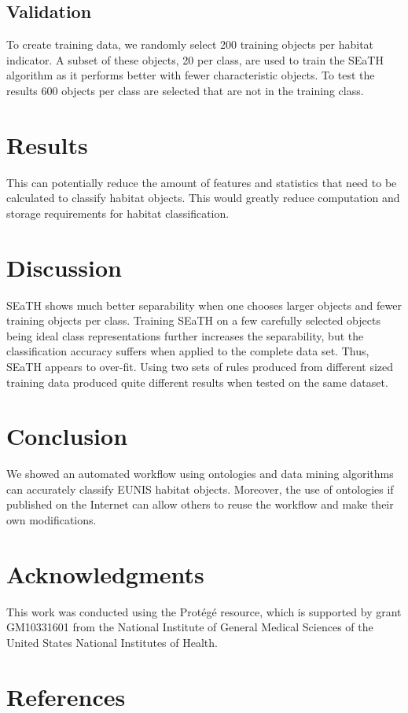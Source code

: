 \documentclass[authoryear, review,12pt,number]{elsarticle}
\begin{document}
\subsection{Validation}
To create training data, we randomly select 200 training objects per habitat
indicator. A subset of these objects, 20 per class, are used to train the SEaTH
algorithm as it performs better with fewer characteristic objects. To test the 
results 600 objects per class are selected that are not in the training class.

\section{Results}
This can potentially reduce the amount of features
and statistics that need to be calculated to classify habitat objects. This
would greatly reduce computation and storage requirements for habitat
classification.
\section{Discussion}
SEaTH shows much better separability when one chooses larger objects and fewer
training objects per class. Training SEaTH on a few carefully selected objects
being ideal class representations further increases the separability, but the 
classification
accuracy suffers when applied to the complete data set. Thus, SEaTH appears to
over-fit. Using two sets of rules produced from different sized training data
produced quite different results when tested on the same dataset.
\section{Conclusion}
We showed an automated workflow using ontologies and data mining algorithms can
accurately classify EUNIS habitat objects. Moreover, the use of ontologies if
published on the Internet can allow others to reuse the workflow and make their own
modifications.
\section{Acknowledgments}
This work was conducted using the Prot\'eg\'e resource, which
is supported by grant GM10331601 from the National Institute of General
Medical Sciences of the United States National Institutes of Health.

\section{References}

\end{document}

